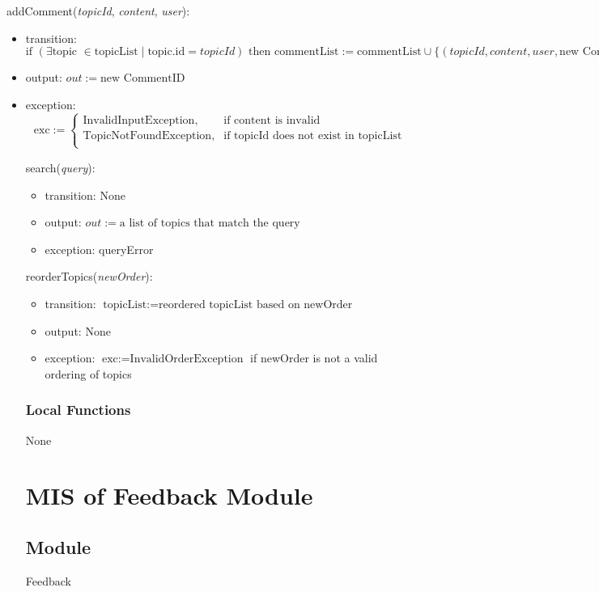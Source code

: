 \documentclass[12pt, titlepage]{article}
\begin{document}
\noindent addComment(\textit{topicId}, \textit{content}, \textit{user}):
\begin{itemize}
\item transition: 
\[
\text{if } (\exists \text{topic } \in \text{topicList} \mid \text{topic.id} = \textit{topicId}) \text{ then } 
\text{commentList} := \text{commentList} \cup \{(\textit{topicId}, \textit{content}, \textit{user}, \text{new CommentID})\}
\]
\item output: \( out := \text{new CommentID} \)
\item exception: 
\[
\text{exc} := \begin{cases}
\text{InvalidInputException}, & \text{if content is invalid} \\
\text{TopicNotFoundException}, & \text{if topicId does not exist in topicList} \\
\end{cases}
\]

\noindent search(\textit{query}):
\begin{itemize}
\item transition: None
\item output: \( out := \text{a list of topics that match the query} \)
\item exception: queryError
\end{itemize}

\noindent reorderTopics(\textit{newOrder}):
\begin{itemize}
\item transition: \( \text{topicList} := \text{reordered topicList based on newOrder} \)
\item output: None
\item exception: \( \text{exc} := \text{InvalidOrderException} \) if newOrder is not a valid ordering of topics
\end{itemize}

\subsubsection{Local Functions}

None

\newpage
\section{MIS of Feedback Module} \label{FeedbackModule}

\subsection{Module}
Feedback


\end{itemize}
\end{document}
